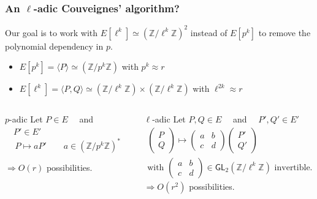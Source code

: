 \documentclass[10pt]{beamer}
\theoremstyle{plain}
\theoremstyle{definition}
\theoremstyle{definition}
\theoremstyle{definition}
\theoremstyle{definition}
\theoremstyle{remark}
\theoremstyle{remark}
\newcommand{\orangebox}[2]{\begin{block}{#1}#2\end{block}}
\begin{document}
\begin{frame}

  \frametitle{An $\ell$-adic Couveignes' algorithm?}
  \orangebox{}{
    Our goal is to work with \boldmath $E[\ell^k]\simeq \left(\mathbb{Z}/\ell^k \mathbb{Z} \right)^2$ \unboldmath 
    instead of $E[p^k]$ to remove the polynomial dependency in $p$.
    \begin{itemize}

    \item $E[p^k] = \langle P\rangle\simeq\left(\mathbb{Z}/p^{k} \mathbb{Z}
      \right)$ \hfill with $p^{k} \approx r$
    \item $E[\ell^k] = \langle P,Q\rangle\simeq\left(\mathbb{Z}/\ell^{k}
        \mathbb{Z} \right) \times \left(\mathbb{Z}/\ell^{k} \mathbb{Z} \right)$
      \hfill with $\ell^{2k} \approx r$
    \end{itemize}}
  \pause
  \begin{columns}
    \begin{column}{0.45\textwidth}

      \orangebox{$p$-adic}{
        Let $P\in E\quad$ and $\quad P'\in E'$
        \[
          P \mapsto a P'  \qquad a\in(\mathbb{Z}/p^k\mathbb{Z})^*
        \]

        $\Rightarrow O(r)$ possibilities.
      }
    \end{column}
    \begin{column}{0.50\textwidth}
      \orangebox{$\ell$-adic}{
        Let $P,Q \in E\quad$ and $\quad P',Q' \in E'$
        \begin{gather*}
          \begin{pmatrix}
            P\\Q
          \end{pmatrix}
          \mapsto
          \begin{pmatrix}
            a & b \\
            c & d
          \end{pmatrix}
          \begin{pmatrix}
            P'\\Q'
          \end{pmatrix}
          \\[1ex]
          \text{with $\left(\begin{smallmatrix}a&b\\c&d\end{smallmatrix}\right)\in \mathsf{GL}_2(\mathbb{Z}/\ell^k\mathbb{Z})$ invertible}.
        \end{gather*}
        $\Rightarrow O(r^2)$ possibilities.
      }
    \end{column}
  \end{columns}


\end{frame}
\end{document}
